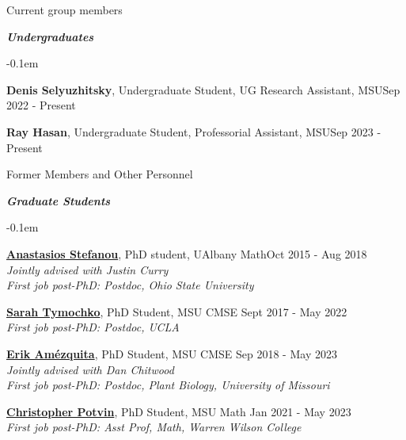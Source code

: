 \documentclass{resume} %
\begin{document}
\begin{rSection}{Current group members}
\begin{list}{}{\leftmargin=1em}
\end{list}

\textbf{\textit{Undergraduates}}
\begin{list}{}{\leftmargin=1em}
   \itemsep -0.1em %
   \item \textbf{Denis Selyuzhitsky}, Undergraduate Student, UG Research Assistant, MSU\hfill Sep 2022 - Present
   \item \textbf{Ray Hasan}, Undergraduate Student, Professorial Assistant, MSU\hfill Sep 2023 - Present
\end{list}

\end{rSection}
\begin{rSection}{Former Members and Other Personnel}


\textbf{\textit{Graduate Students}}
\begin{list}{}{\leftmargin=1em}
   \itemsep -0.1em %


   \item \textbf{\href{https://sites.google.com/view/anastasiostefanou/home}{Anastasios Stefanou}}, PhD student, UAlbany Math\hfill Oct 2015 - Aug 2018
\\
   \phantom{XXX} \textit{Jointly advised with Justin Curry}
\\
   \phantom{XXX} \textit{First job post-PhD: Postdoc, Ohio State University}


   \item \textbf{\href{https://www.sarahtymochko.com/}{Sarah Tymochko}}, PhD Student, MSU CMSE \hfill Sept 2017 - May 2022
\\
   \phantom{XXX} \textit{First job post-PhD: Postdoc, UCLA}

   \item \textbf{\href{https://ejamezquita.github.io/}{Erik Am\'ezquita}}, PhD Student, MSU CMSE \hfill Sep 2018 - May 2023
\\
   \phantom{XXX} \textit{Jointly advised with Dan Chitwood}\\
   \phantom{XXX} \textit{First job post-PhD: Postdoc, Plant Biology, University of Missouri}

   \item \textbf{\href{https://sites.google.com/view/christopherpotvin/home}{Christopher Potvin}}, PhD Student, MSU Math \hfill Jan 2021 - May 2023\\
   \phantom{XXX} \textit{First job post-PhD: Asst Prof, Math, Warren Wilson College}


\end{list}
\end{rSection}
\end{document}
